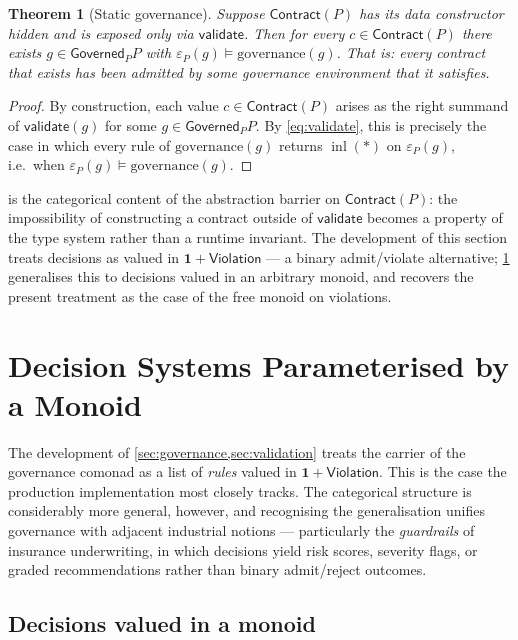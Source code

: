 \documentclass[journal,10pt]{IEEEtran}
\theoremstyle{plain}
\newtheorem{theorem}{Theorem}
\theoremstyle{definition}
\theoremstyle{remark}
\DeclareMathOperator{\inl}{inl}
\newcommand{\Governed}{\mathsf{Governed}}
\newcommand{\Contract}{\mathsf{Contract}}
\newcommand{\Violation}{\mathsf{Violation}}
\newcommand{\Validate}{\mathsf{validate}}
\begin{document}
\begin{theorem}[Static governance]\label{thm:static}
Suppose $\Contract(P)$ has its data constructor hidden and is exposed
only via $\Validate$. Then for every $c \in \Contract(P)$ there
exists $g \in \Governed_P P$ with
$\varepsilon_P(g) \models \mathrm{governance}(g)$. That is: every
contract that exists has been admitted by some governance environment
that it satisfies.
\end{theorem}

\begin{proof}
By construction, each value $c \in \Contract(P)$ arises as the
right summand of $\Validate(g)$ for some $g \in \Governed_P P$.
By \cref{eq:validate}, this is precisely the case in which every
rule of $\mathrm{governance}(g)$ returns $\inl(*)$ on
$\varepsilon_P(g)$, i.e.\ when
$\varepsilon_P(g) \models \mathrm{governance}(g)$.
\end{proof}

 is the categorical content of the abstraction
barrier on $\Contract(P)$: the impossibility of constructing a
contract outside of $\Validate$ becomes a property of the type system
rather than a runtime invariant. The development of this section
treats decisions as valued in $\mathbf{1} + \Violation$ — a binary
admit/violate alternative; \cref{sec:decisions} generalises this
to decisions valued in an arbitrary monoid, and recovers the present
treatment as the case of the free monoid on violations.

\section{Decision Systems Parameterised by a Monoid}
\label{sec:decisions}

The development of \cref{sec:governance,sec:validation} treats the
carrier of the governance comonad as a list of \emph{rules} valued
in $\mathbf{1} + \Violation$. This is the case the production
implementation most closely tracks. The categorical structure is
considerably more general, however, and recognising the
generalisation unifies governance with adjacent industrial
notions — particularly the \emph{guardrails} of insurance
underwriting, in which decisions yield risk scores, severity flags,
or graded recommendations rather than binary admit/reject outcomes.

\subsection{Decisions valued in a monoid}
\end{document}
